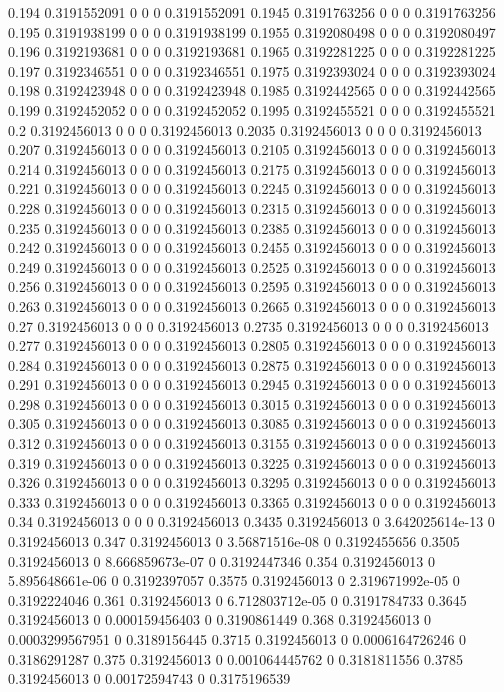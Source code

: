 {0.194 0.3191552091 0 0 0 0.3191552091
0.1945 0.3191763256 0 0 0 0.3191763256
0.195 0.3191938199 0 0 0 0.3191938199
0.1955 0.3192080498 0 0 0 0.3192080497
0.196 0.3192193681 0 0 0 0.3192193681
0.1965 0.3192281225 0 0 0 0.3192281225
0.197 0.3192346551 0 0 0 0.3192346551
0.1975 0.3192393024 0 0 0 0.3192393024
0.198 0.3192423948 0 0 0 0.3192423948
0.1985 0.3192442565 0 0 0 0.3192442565
0.199 0.3192452052 0 0 0 0.3192452052
0.1995 0.3192455521 0 0 0 0.3192455521
0.2 0.3192456013 0 0 0 0.3192456013
0.2035 0.3192456013 0 0 0 0.3192456013
0.207 0.3192456013 0 0 0 0.3192456013
0.2105 0.3192456013 0 0 0 0.3192456013
0.214 0.3192456013 0 0 0 0.3192456013
0.2175 0.3192456013 0 0 0 0.3192456013
0.221 0.3192456013 0 0 0 0.3192456013
0.2245 0.3192456013 0 0 0 0.3192456013
0.228 0.3192456013 0 0 0 0.3192456013
0.2315 0.3192456013 0 0 0 0.3192456013
0.235 0.3192456013 0 0 0 0.3192456013
0.2385 0.3192456013 0 0 0 0.3192456013
0.242 0.3192456013 0 0 0 0.3192456013
0.2455 0.3192456013 0 0 0 0.3192456013
0.249 0.3192456013 0 0 0 0.3192456013
0.2525 0.3192456013 0 0 0 0.3192456013
0.256 0.3192456013 0 0 0 0.3192456013
0.2595 0.3192456013 0 0 0 0.3192456013
0.263 0.3192456013 0 0 0 0.3192456013
0.2665 0.3192456013 0 0 0 0.3192456013
0.27 0.3192456013 0 0 0 0.3192456013
0.2735 0.3192456013 0 0 0 0.3192456013
0.277 0.3192456013 0 0 0 0.3192456013
0.2805 0.3192456013 0 0 0 0.3192456013
0.284 0.3192456013 0 0 0 0.3192456013
0.2875 0.3192456013 0 0 0 0.3192456013
0.291 0.3192456013 0 0 0 0.3192456013
0.2945 0.3192456013 0 0 0 0.3192456013
0.298 0.3192456013 0 0 0 0.3192456013
0.3015 0.3192456013 0 0 0 0.3192456013
0.305 0.3192456013 0 0 0 0.3192456013
0.3085 0.3192456013 0 0 0 0.3192456013
0.312 0.3192456013 0 0 0 0.3192456013
0.3155 0.3192456013 0 0 0 0.3192456013
0.319 0.3192456013 0 0 0 0.3192456013
0.3225 0.3192456013 0 0 0 0.3192456013
0.326 0.3192456013 0 0 0 0.3192456013
0.3295 0.3192456013 0 0 0 0.3192456013
0.333 0.3192456013 0 0 0 0.3192456013
0.3365 0.3192456013 0 0 0 0.3192456013
0.34 0.3192456013 0 0 0 0.3192456013
0.3435 0.3192456013 0 3.642025614e-13 0 0.3192456013
0.347 0.3192456013 0 3.56871516e-08 0 0.3192455656
0.3505 0.3192456013 0 8.666859673e-07 0 0.3192447346
0.354 0.3192456013 0 5.895648661e-06 0 0.3192397057
0.3575 0.3192456013 0 2.319671992e-05 0 0.3192224046
0.361 0.3192456013 0 6.712803712e-05 0 0.3191784733
0.3645 0.3192456013 0 0.000159456403 0 0.3190861449
0.368 0.3192456013 0 0.0003299567951 0 0.3189156445
0.3715 0.3192456013 0 0.0006164726246 0 0.3186291287
0.375 0.3192456013 0 0.001064445762 0 0.3181811556
0.3785 0.3192456013 0 0.00172594743 0 0.3175196539
}
